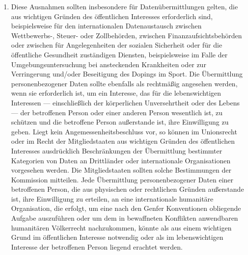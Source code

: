 \begin{enumerate}
   \item Diese Ausnahmen sollten insbesondere für Datenübermittlungen gelten, die aus wichtigen Gründen des öffentlichen
    Interesses erforderlich sind, beispielsweise für den internationalen Datenaustausch zwischen Wettbewerbs-, Steuer-
    oder Zollbehörden, zwischen Finanzaufsichtsbehörden oder zwischen für Angelegenheiten der sozialen Sicherheit oder
    für die öffentliche Gesundheit zuständigen Diensten, beispielsweise im Falle der Umgebungsuntersuchung bei
    ansteckenden Krankheiten oder zur Verringerung und/oder Beseitigung des Dopings im Sport. Die Übermittlung
    personenbezogener Daten sollte ebenfalls als rechtmäßig angesehen werden, wenn sie erforderlich ist, um ein
    Interesse, das für die lebenswichtigen Interessen — einschließlich der körperlichen Unversehrtheit oder des
    Lebens — der betroffenen Person oder einer anderen Person wesentlich ist, zu schützen und die betroffene Person
    außerstande ist, ihre Einwilligung zu geben. Liegt kein Angemessenheitsbeschluss vor, so können im Unionsrecht oder
    im Recht der Mitgliedstaaten aus wichtigen Gründen des öffentlichen Interesses ausdrücklich Beschränkungen der
    Übermittlung bestimmter Kategorien von Daten an Drittländer oder internationale Organisationen vorgesehen werden.
    Die Mitgliedstaaten sollten solche Bestimmungen der Kommission mitteilen. Jede Übermittlung personenbezogener Daten
    einer betroffenen Person, die aus physischen oder rechtlichen Gründen außerstande ist, ihre Einwilligung zu
    erteilen, an eine internationale humanitäre Organisation, die erfolgt, um eine nach den Genfer Konventionen
    obliegende Aufgabe auszuführen oder um dem in bewaffneten Konflikten anwendbaren humanitären Völkerrecht
    nachzukommen, könnte als aus einem wichtigen Grund im öffentlichen Interesse notwendig oder als im lebenswichtigen
    Interesse der betroffenen Person liegend erachtet werden.%
   \label{eg:112}
   


\end{enumerate}
